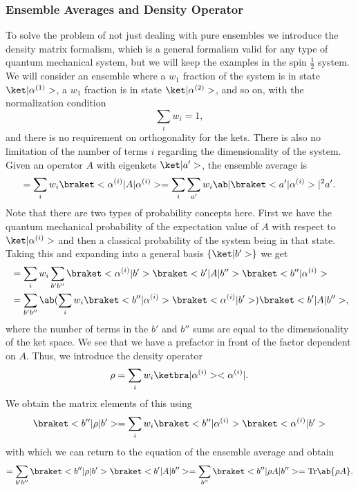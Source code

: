 \subsubsection{Ensemble Averages and Density Operator}
To solve the problem of not just dealing with pure ensembles we introduce the density matrix formalism, which is a general formalism valid for any type of quantum mechanical system, but we will keep the examples in the spin $\frac{1}{2}$ system. We will consider an ensemble where a $w_1$ fraction of the system is in state $\k{\alpha^{(1)}}$, a $w_1$ fraction is in state $\k{\alpha^{(2)}}$, and so on, with the normalization condition
\begin{equation}
    \sum_i w_i = 1,
\end{equation}
and there is no requirement on orthogonality for the kets. There is also no limitation of the number of terms $i$ regarding the dimensionality of the system. Given an operator $A$ with eigenkets $\k{a'}$, the ensemble average is 
\begin{equation}
    [A] = \sum_i w_i \bkop{\alpha^{(i)}}{A}{\alpha^{(i)}} = \sum_i \sum_{a'} w_i \abs{\bk{a'}{\alpha^{(i)}}}^2 a'.
\end{equation}
Note that there are two types of probability concepts here. First we have the quantum mechanical probability of the expectation value of $A$ with respect to $\k{\alpha^{(i)}}$ and then a classical probability of the system being in that state. Taking this and expanding into a general basis $\{\k{b'}\}$ we get
\begin{align}
    [A] &= \sum_i w_i \sum_{b'b''} \bk{\alpha^{(i)}}{b'} \bkop{b'}{A}{b''} \bk{b''}{\alpha^{(i)}}\\
    &= \sum_{b'b''} \ab ( \sum_i w_i \bk{b''}{\alpha^{(i)}} \bk{\alpha^{(i)}}{b'} ) \bkop{b'}{A}{b''},
\end{align}
where the number of terms in the $b'$ and $b''$ sums are equal to the dimensionality of the ket space. We see that we have a prefactor in front of the factor dependent on $A$. Thus, we introduce the density operator
\begin{equation}
    \rho = \sum_i w_i \kb{\alpha^{(i)}}{\alpha^{(i)}}.
\end{equation}
We obtain the matrix elements of this using
\begin{equation}
    \bkop{b''}{\rho}{b'} = \sum_i w_i \bk{b''}{\alpha^{(i)}}\bk{\alpha^{(i)}}{b'}
\end{equation}
with which we can return to the equation of the ensemble average and obtain
\begin{equation}
    [A] = \sum_{b'b''} \bkop{b''}{\rho}{b'}\bkop{b'}{A}{b''} = \sum_{b''} \bkop{b''}{\rho A}{b''} = \trace{\rho A}.
\end{equation}
